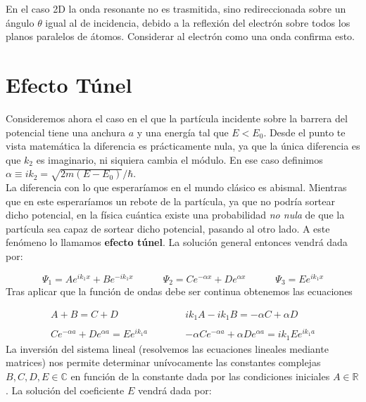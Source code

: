 \documentclass[12pt,a4paper]{article}
\numberwithin{equation}{section}
\numberwithin{figure}{section}
\newcommand{\tquad}{\quad \quad \quad}
\begin{document}
En el caso 2D la onda resonante no es trasmitida, sino redireccionada sobre un ángulo $\theta$ igual al de incidencia, debido a la reflexión del electrón sobre todos los planos paralelos de átomos. Considerar al electrón como una onda confirma esto.


\section{Efecto Túnel}

Consideremos ahora el caso en el que la partícula incidente sobre la barrera del potencial tiene una anchura $a$ y una energía tal que $E<E_0$. Desde el punto te vista matemática la diferencia es prácticamente nula, ya que la única diferencia es que $k_2$ es imaginario, ni siquiera cambia el módulo. En ese caso definimos $\alpha \equiv ik_2 = \sqrt{2m(E-E_0)}/\hbar$. \\

La diferencia con lo que esperaríamos en el mundo clásico es abismal. Mientras que en este esperaríamos un rebote de la partícula, ya que no podría sortear dicho potencial, en la física cuántica existe una probabilidad \textit{no nula} de que la partícula sea capaz de sortear dicho potencial, pasando al otro lado. A este fenómeno lo llamamos \textbf{efecto túnel}. La solución general entonces vendrá dada por: 

\begin{equation}
\Psi_1 = A e^{ik_1x} +  B e^{-ik_1x}  \tquad
\Psi_2 = C e^{-\alpha x} +  D e^{\alpha x}  \tquad
\Psi_3 = E e^{ik_1x} 
\end{equation}
Tras aplicar que la función de ondas debe ser continua obtenemos las ecuaciones


\begin{equation}
\begin{array}{cc} 
A + B = C + D \tquad & ik_1 A - i k_1 B =- \alpha C+ \alpha D \\ \\
C e^{-\alpha a} + D e^{\alpha a} = E e^{ik_1a} \tquad & - \alpha C e^{-\alpha a}  +\alpha D e^{\alpha a}  = i k_1 E  e^{ik_1a} 
\end{array}
\end{equation}
La inversión del sistema lineal (resolvemos las ecuaciones lineales mediante matrices) nos permite determinar unívocamente las constantes complejas $B,C,D,E \in  \mathbb{C}$ en función de la constante dada por las condiciones iniciales $A \in \mathbb{R}$. La solución del coeficiente $E$ vendrá dada por:
\end{document}

